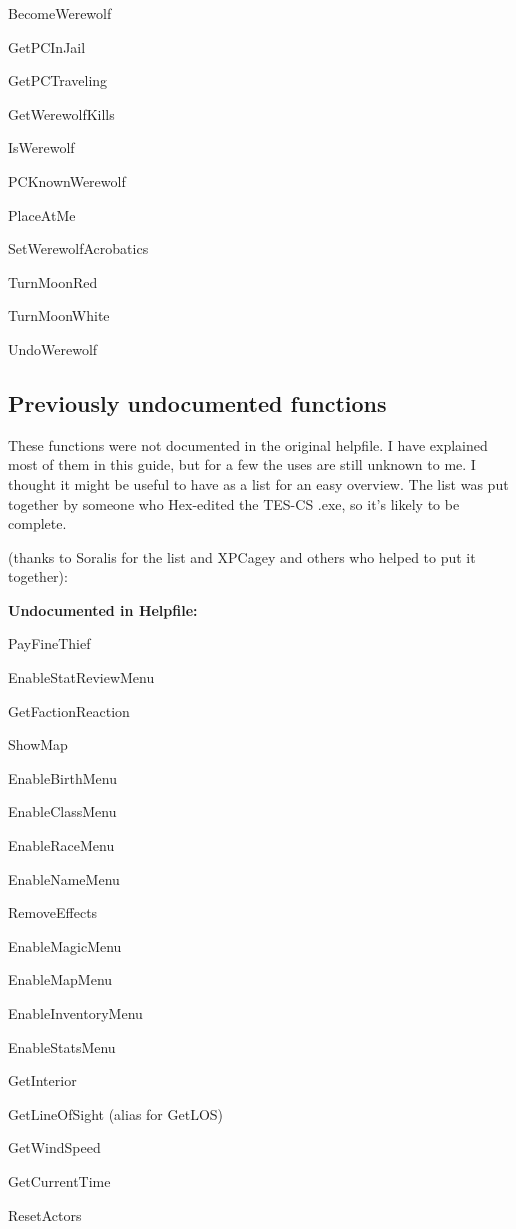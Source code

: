 \documentclass[
]{article}
\begin{document}
BecomeWerewolf

GetPCInJail

GetPCTraveling

GetWerewolfKills

IsWerewolf

PCKnownWerewolf

PlaceAtMe

SetWerewolfAcrobatics

TurnMoonRed

TurnMoonWhite

UndoWerewolf

\hypertarget{previously-undocumented-functions}{%
\subsection{\texorpdfstring{\hfill\break
Previously undocumented
functions}{ Previously undocumented functions}}\label{previously-undocumented-functions}}

These functions were not documented in the original helpfile. I have
explained most of them in this guide, but for a few the uses are still
unknown to me. I thought it might be useful to have as a list for an
easy overview. The list was put together by someone who Hex-edited the
TES-CS .exe, so it's likely to be complete.

(thanks to Soralis for the list and XPCagey and others who helped to put
it together):

\textbf{Undocumented in Helpfile:}

PayFineThief

EnableStatReviewMenu

GetFactionReaction

ShowMap

EnableBirthMenu

EnableClassMenu

EnableRaceMenu

EnableNameMenu

RemoveEffects

EnableMagicMenu

EnableMapMenu

EnableInventoryMenu

EnableStatsMenu

GetInterior

GetLineOfSight (alias for GetLOS)

GetWindSpeed

GetCurrentTime

ResetActors
\end{document}
